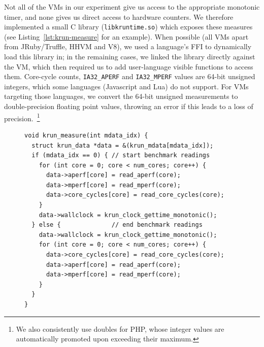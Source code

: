 \documentclass[preprint,numbers,10pt]{sigplanconf}
\begin{document}
Not all of the VMs in our experiment give us access to the appropriate monotonic
timer, and none gives us direct access to hardware counters. We therefore
implemented a small C library (\texttt{libkruntime.so}) which exposes these
measures (see Listing~\ref{lst:krun-measure} for an example). When possible
(all VMs apart from JRuby/Truffle, HHVM and V8), we used a language's FFI to dynamically load this library
in; in the remaining cases, we linked the library directly against the VM, which
then required us to add user-language visible functions to access them.
Core-cycle counts, \texttt{IA32\_APERF} and \texttt{IA32\_MPERF}
values are 64-bit unsigned integers, which some languages
(Javascript and Lua) do not support. For VMs targeting those languages, we
convert the 64-bit unsigned measurements to
double-precision floating point values, throwing an error if this leads to a
loss of precision.~\footnote{We also consistently use doubles for PHP, whose
integer values are automatically promoted upon exceeding their maximum.}

\begin{figure}[t]
\begin{lstlisting}[label=lst:krun-measure, xleftmargin=0cm,
        caption={%
\texttt{krun\_measure}: Measurements can't be taken atomically, so later
measurements include the time taken to read earlier measurements. Since
wall-clock time is the most important measure, it is innermost; since
the APERF / MPERF ratio is a sanity check, it is outermost. Note that
the APERF / MPERF ratios must be read in the same order both before
and after a benchmark.}]
void krun_measure(int mdata_idx) {
  struct krun_data *data = &(krun_mdata[mdata_idx]);
  if (mdata_idx == 0) { // start benchmark readings
    for (int core = 0; core < num_cores; core++) {
      data->aperf[core] = read_aperf(core);
      data->mperf[core] = read_mperf(core);
      data->core_cycles[core] = read_core_cycles(core);
    }
    data->wallclock = krun_clock_gettime_monotonic();
  } else {              // end benchmark readings
    data->wallclock = krun_clock_gettime_monotonic();
    for (int core = 0; core < num_cores; core++) {
      data->core_cycles[core] = read_core_cycles(core);
      data->aperf[core] = read_aperf(core);
      data->mperf[core] = read_mperf(core);
    }
  }
}
\end{lstlisting}
\vspace{-.8cm}
\end{figure}
\end{document}
